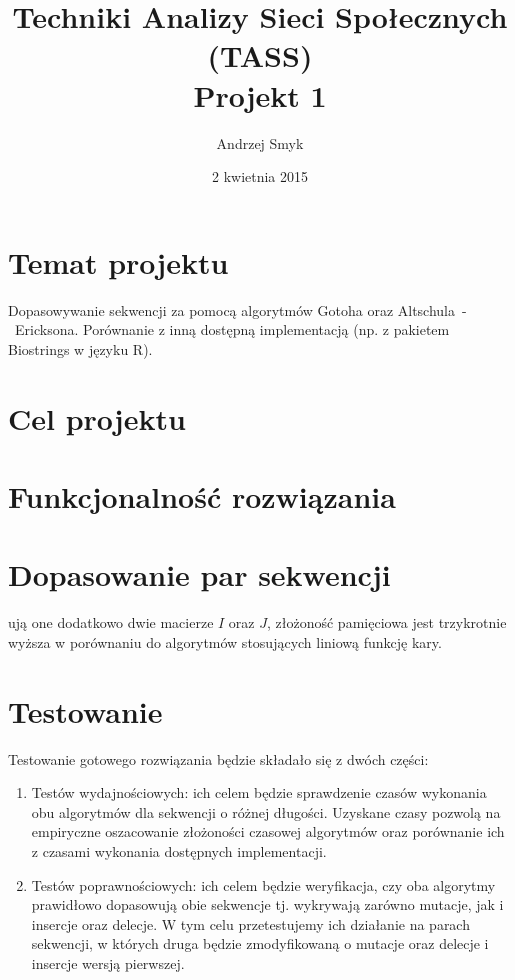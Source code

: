 \documentclass[a4paper,10pt]{article}
\title{Techniki Analizy Sieci Społecznych (TASS)\\Projekt 1}
\author{Andrzej Smyk}
\date{2 kwietnia 2015}
\begin{document}
	\maketitle
	\section{Temat projektu}

	Dopasowywanie sekwencji za pomocą algorytmów Gotoha oraz \linebreak\mbox{Altschula - Ericksona}. Porównanie z inną dostępną implementacją (np. z pakietem Biostrings w języku R).

	\section{Cel projektu}

	

	\section{Funkcjonalność rozwiązania}

	

	\section{Dopasowanie par sekwencji}

	ują one dodatkowo dwie macierze $I$ oraz $J$, złożoność pamięciowa jest trzykrotnie wyższa w porównaniu do algorytmów stosujących liniową funkcję kary.

	\section{Testowanie}

	Testowanie gotowego rozwiązania będzie składało się z dwóch części:
	\begin{enumerate}
		\item Testów wydajnościowych: ich celem będzie sprawdzenie czasów wykonania obu algorytmów dla sekwencji o różnej długości. Uzyskane czasy pozwolą na empiryczne oszacowanie złożoności czasowej algorytmów oraz porównanie ich z czasami wykonania dostępnych implementacji.
		\item Testów poprawnościowych: ich celem będzie weryfikacja, czy oba algorytmy prawidłowo dopasowują obie sekwencje tj. wykrywają zarówno mutacje, jak i insercje oraz delecje. W tym celu przetestujemy ich działanie na parach sekwencji, w których druga będzie zmodyfikowaną o mutacje oraz delecje i insercje wersją pierwszej.
	\end{enumerate}
\end{document}

